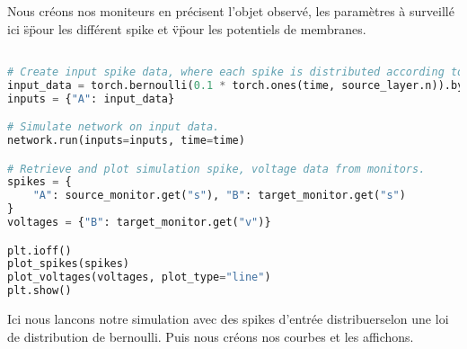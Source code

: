 Nous créons nos moniteurs en précisent l'objet observé, les paramètres à surveillé ici \"s\" pour les différent spike et \"v\" pour les potentiels de membranes.

\begin{lstlisting}[language=Python, caption=Python example]

# Create input spike data, where each spike is distributed according to Bernoulli(0.1).
input_data = torch.bernoulli(0.1 * torch.ones(time, source_layer.n)).byte()
inputs = {"A": input_data}

# Simulate network on input data.
network.run(inputs=inputs, time=time)

# Retrieve and plot simulation spike, voltage data from monitors.
spikes = {
    "A": source_monitor.get("s"), "B": target_monitor.get("s")
}
voltages = {"B": target_monitor.get("v")}

plt.ioff()
plot_spikes(spikes)
plot_voltages(voltages, plot_type="line")
plt.show()

\end{lstlisting}

Ici nous lancons notre simulation avec des spikes d'entrée distribuerselon une loi de distribution de bernoulli.
Puis nous créons nos courbes et les affichons.
